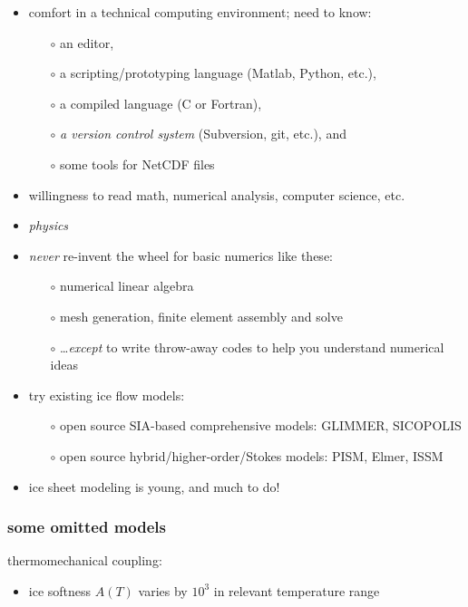\documentclass[titlepage,letterpaper,final,12pt]{scrartcl}
\begin{document}
\begin{itemize}
\item comfort in a technical computing environment; need to know:
  \begin{itemize}\small
  \item[$\circ$] an editor,
  \item[$\circ$] a scripting/prototyping language (Matlab, Python, etc.),
  \item[$\circ$] a compiled language (C or Fortran),
  \item[$\circ$] \emph{a version control system} (Subversion, git, etc.), and
  \item[$\circ$] some tools for NetCDF files
  \normalsize
  \end{itemize}
\item willingness to read math, numerical analysis, computer science, etc.
\item \emph{physics}
\item \emph{never} re-invent the wheel for basic numerics like these:
  \begin{itemize}
  \item[$\circ$] numerical linear algebra
  \item[$\circ$] mesh generation, finite element assembly and solve
  \item[$\circ$] \dots \emph{except} to write throw-away codes to help you understand numerical ideas 
  \end{itemize}
\item try existing ice flow models:
  \begin{itemize}
  \item[$\circ$] open source SIA-based comprehensive models: GLIMMER, SICOPOLIS
  \item[$\circ$] open source hybrid/higher-order/Stokes models: PISM, Elmer, ISSM
  \end{itemize}
\item ice sheet modeling is young, and much to do!
\end{itemize}


\subsubsection*{some omitted models}

thermomechanical coupling:

\begin{itemize}
\item ice softness $A(T)$ varies by $10^3$ in relevant temperature range
\end{itemize}
\end{document}
